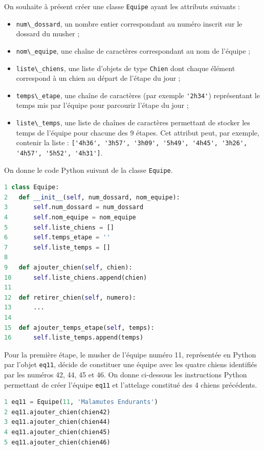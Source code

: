 On souhaite à présent créer une classe \passthrough{\lstinline!Equipe!}
ayant les attributs suivants :

\begin{itemize}
\item
  \passthrough{\lstinline!num\_dossard!}, un nombre entier correspondant
  au numéro inscrit sur le dossard du musher ;
\item
  \passthrough{\lstinline!nom\_equipe!}, une chaîne de caractères
  correspondant au nom de l'équipe ;
\item
  \passthrough{\lstinline!liste\_chiens!}, une liste d'objets de type
  \passthrough{\lstinline!Chien!} dont chaque élément correspond à un
  chien au départ de l'étape du jour ;
\item
  \passthrough{\lstinline!temps\_etape!}, une chaîne de caractères (par
  exemple \passthrough{\lstinline!'2h34'!}) représentant le temps mis
  par l'équipe pour parcourir l'étape du jour ;
\item
  \passthrough{\lstinline!liste\_temps!}, une liste de chaînes de
  caractères permettant de stocker les temps de l'équipe pour chacune
  des 9 étapes. Cet attribut peut, par exemple, contenir la liste :
  \passthrough{\lstinline!['4h36', '3h57', '3h09', '5h49', '4h45', '3h26', '4h57', '5h52', '4h31']!}.
\end{itemize}

On donne le code Python suivant de la classe
\passthrough{\lstinline!Equipe!}.

\begin{lstlisting}[language=Python]
1 class Equipe:
2   def __init__(self, num_dossard, nom_equipe):
3       self.num_dossard = num_dossard
4       self.nom_equipe = nom_equipe
5       self.liste_chiens = []
6       self.temps_etape = ''
7       self.liste_temps = []
8
9   def ajouter_chien(self, chien):
10      self.liste_chiens.append(chien)
11
12  def retirer_chien(self, numero):
13      ...
14
15  def ajouter_temps_etape(self, temps):
16      self.liste_temps.append(temps)
\end{lstlisting}

Pour la première étape, le musher de l'équipe numéro 11, représentée en
Python par l'objet \passthrough{\lstinline!eq11!}, décide de constituer
une équipe avec les quatre chiens identifiés par les numéros 42, 44, 45
et 46. On donne ci-dessous les instructions Python permettant de créer
l'équipe \passthrough{\lstinline!eq11!} et l'attelage constitué des 4
chiens précédents.

\begin{lstlisting}[language=Python]
1 eq11 = Equipe(11, 'Malamutes Endurants')
2 eq11.ajouter_chien(chien42)
3 eq11.ajouter_chien(chien44)
4 eq11.ajouter_chien(chien45)
5 eq11.ajouter_chien(chien46)
\end{lstlisting}

